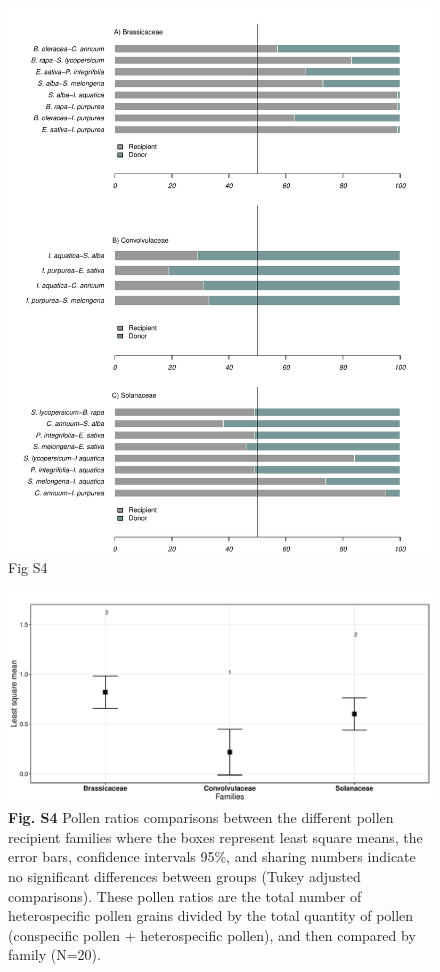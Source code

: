 \documentclass[
  12pt,
]{article}
\begin{document}
\begin{figure}
\centering
\includegraphics{Supp_Material_files/figure-latex/unnamed-chunk-6-1.pdf}
\caption{Fig S4}
\end{figure}

\clearpage

\begin{figure}
\centering
\includegraphics{Supp_Material_files/figure-latex/unnamed-chunk-7-1.pdf}
\caption{\textbf{Fig. S4} Pollen ratios comparisons between the
different pollen recipient families where the boxes represent least
square means, the error bars, confidence intervals 95\%, and sharing
numbers indicate no significant differences between groups (Tukey
adjusted comparisons). These pollen ratios are the total number of
heterospecific pollen grains divided by the total quantity of pollen
(conspecific pollen + heterospecific pollen), and then compared by
family (N=20).}
\end{figure}
\end{document}

